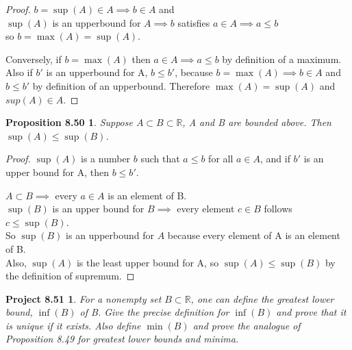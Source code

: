 \documentclass[12pt]{amsart}
\newcommand{\R}{\mathbb{R}}
\begin{document}
\begin{proof}
	$b = \sup(A) \in A \implies b \in A$ and \\
	$\sup(A)$ is an upperbound for $A \implies b$ satisfies $a\in A \implies a \le b$ \\
	so $b = \max(A) = \sup(A)$.
	
	Conversely, if $b=\max(A)$ then $a\in A \implies a \le b$ by definition of a maximum. \\
	Also if $b'$ is an upperbound for A, $b \le b'$, because $b=\max(A) \implies b\in A$ and $b \le b'$ by definition of an upperbound. Therefore $\max(A) = \sup(A)$ and $sup(A) \in A$.
\end{proof}

\newtheorem*{prop8.50}{Proposition 8.50}
\begin{prop8.50}
	Suppose $A \subset B \subset \R$, A and B are bounded above. Then $\sup(A) \le \sup(B)$.
\end{prop8.50}

\begin{proof}
	$\sup(A)$ is a number $b$ such that $a \le b$ for all $a \in A$, and if $b'$ is an upper bound for A, then $b \le b'$.
	
	$A \subset B \implies$ every $a \in A$ is an element of B. \\
	$\sup(B)$ is an upper bound for $B \implies$ every element $c \in B$ follows $c \le \sup(B)$. \\
	So $\sup(B)$ is an upperbound for $A$ because every element of A is an element of B. \\
	Also, $\sup(A)$ is the least upper bound for A, so $\sup(A) \le \sup(B)$ by the definition of supremum.
\end{proof}

\newtheorem*{prop8.51}{Project 8.51}
\begin{prop8.51}
	For a nonempty set $B \subset \R$, one can define the greatest lower bound, $\inf(B)$ of B. Give the precise definition for $\inf(B)$ and prove that it is unique if it exists. Also define $\min(B)$ and prove the analogue of Proposition 8.49 for greatest lower bounds and minima.
\end{prop8.51}
\end{document}
